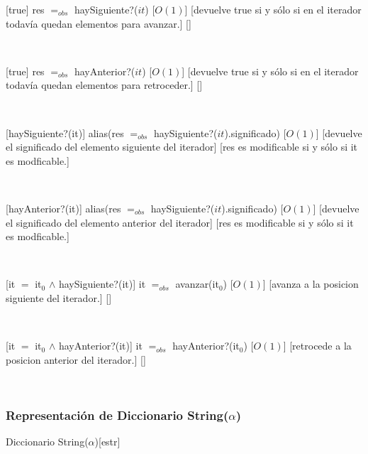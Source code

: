 [true]
{res $=_{obs}$ haySiguiente?($it$)}
[$O(1)$]
[devuelve true si y sólo si en el iterador todavía quedan elementos para avanzar.]
[]

~

[true]
{res $=_{obs}$ hayAnterior?($it$)}
[$O(1)$]
[devuelve true si y sólo si en el iterador todavía quedan elementos para retroceder.]
[]



~

[haySiguiente?(it)]
{alias(res $=_{obs}$ haySiguiente?($it$).significado)}
[$O(1)$]
[devuelve el significado del elemento siguiente del iterador]
[res es modificable si y sólo si it es modficable.]

~


[hayAnterior?(it)]
{alias(res $=_{obs}$ haySiguiente?($it$).significado)}
[$O(1)$]
[devuelve el significado del elemento anterior del iterador]
[res es modificable si y sólo si it es modficable.]

~

[it $=$ it$_0$ $\land$ haySiguiente?(it)]
{it $=_{obs}$ avanzar(it$_0$)}
[$O(1)$]
[avanza a la posicion siguiente del iterador.]
[]

~

[it $=$ it$_0$ $\land$ hayAnterior?(it)]
{it $=_{obs}$ hayAnterior?(it$_0$)}
[$O(1)$]
[retrocede a la posicion anterior del iterador.]
[]

~


\pagebreak

\subsubsection{Representación de Diccionario String($\alpha$)}

\begin{Estructura}{ Diccionario String($\alpha$)}[estr]
	\begin{Tupla}[estr]
	\end{Tupla}

	~

	\begin{Tupla}[Nodo]
	\end{Tupla}

\end{Estructura}


